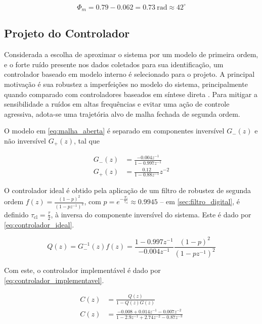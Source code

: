 \documentclass[conference,harvard,brazil,english]{sbatex}
\begin{document}
\begin{equation}
    \label{eq:margem_fase}
    \Phi_m = 0.79 - 0.062 = 0.73\ \text{rad} \approx 42^\circ
\end{equation}

\subsection{Projeto do Controlador}

Considerada a escolha de aproximar o sistema por um modelo de primeira ordem, e o forte ruído presente nos dados coletados para sua identificação, um controlador baseado em modelo interno é selecionado para o projeto. A principal motivação é sua robustez a imperfeições no modelo do sistema, principalmente quando comparado com controladores baseados em síntese direta \cite{Garcia1982}. Para mitigar a sensibilidade a ruídos em altas frequências e evitar uma ação de controle agressiva, adota-se uma trajetória alvo de malha fechada de segunda ordem.

O modelo em \ref{eq:malha_aberta} é separado em componentes inversível $G_-(z)$ e não inversível $G_+(z)$, tal que

\begin{align}
    G_-(z) & = \frac{-0.004z^{-1}}{1 - 0.997z^{-1}} \\
    G_+(z) & = \frac{0.12}{1 - 0.88 z^{-1}} z^{-2}
\end{align}

O controlador ideal é obtido pela aplicação de um filtro de robustez de segunda ordem $f(z) = \frac{(1 - p)^2}{(1 - p z^{-1})^2}$, com $p = e^{-\frac{T_s}{\tau_\text{cl}}} \approx 0.9945$ -- em \ref{sec:filtro_digital}, é definido $\tau_\text{cl} = \frac{\tau}{2}$, à inversa do componente inversível do sistema. Este é dado por \ref{eq:controlador_ideal}.

\begin{equation}
    \label{eq:controlador_ideal}
    Q(z) = G_-^{-1}(z) f(z) = \frac{1 - 0.997z^{-1}}{-0.004z^{-1}} \frac{(1 - p)^2}{(1 - p z^{-1})^2}
\end{equation}

Com este, o controlador implementável é dado por \ref{eq:controlador_implementavel}.

\begin{align}
    C(z) & = \frac{Q(z)}{1 - Q(z) G(z)} \\
    C(z) & = \frac{-0.008 + 0.014z^{-1} - 0.007z^{-2}}{1 - 2.9z^{-1} + 2.74z^{-2} - 0.87z^{-3}} \label{eq:controlador_implementavel}
\end{align}
\end{document}

